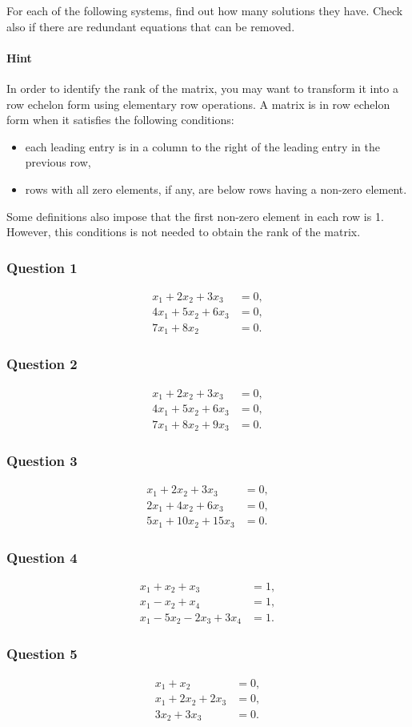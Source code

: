 For each of the following systems, find out how many solutions they have. 
Check also if there are redundant equations that can be removed.

\paragraph{Hint} In order to identify the rank of the matrix, you may want to
transform it into a row echelon form using elementary row operations. A matrix is in row echelon form  when it satisfies the following conditions:
\begin{itemize}
\item each leading entry is in a column to the right of the leading entry in the previous row,
\item rows with all zero elements, if any, are below rows having a non-zero element.
\end{itemize}
Some definitions also impose that the first non-zero element in each
row is 1. However, this conditions is not needed to obtain the rank of
the matrix. 

\subsubsection*{Question 1}
\begin{align*}
x_1+2x_2+3x_3 & = 0,\\
4x_1+5x_2+6x_3 & = 0,\\
7x_1+8x_2& =0.
\end{align*}
\subsubsection*{Question 2}
\begin{align*}
x_1+2x_2+3x_3 & = 0,\\
4x_1+5x_2+6x_3 & = 0,\\
7x_1+8x_2+9x_3 & =0.
\end{align*}
\subsubsection*{Question 3}

\begin{align*}
x_1+2x_2+3x_3 & = 0,\\
2x_1+4x_2+6x_3 & =0,\\
5x_1+10x_2+15x_3 & =0.
\end{align*}
\subsubsection*{Question 4}

\begin{align*}
x_1 + x_2 + x_3 &= 1,\\
x_1 - x_2 + x_4 &= 1, \\
x_1 -5x_2 -2x_3 +3x_4 &= 1.
\end{align*}
\subsubsection*{Question 5}

\begin{align*}
x_1+x_2&=0,\\
x_1+2x_2+2x_3&=0,\\
3x_2+3x_3&=0.
\end{align*}
